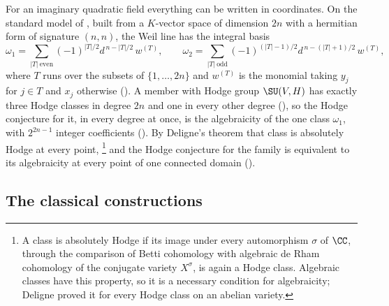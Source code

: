 For an imaginary quadratic field everything can be written in coordinates.
On the standard model of , built from a $K$-vector space of
dimension $2n$ with a hermitian form of signature $(n,n)$, the Weil line has
the integral basis
\[
  \omega_{1}=\sum_{|T|\ \mathrm{even}}(-1)^{|T|/2}d^{\,n-|T|/2}\,w^{(T)},
  \qquad
  \omega_{2}=\sum_{|T|\ \mathrm{odd}}(-1)^{(|T|-1)/2}d^{\,n-(|T|+1)/2}\,w^{(T)},
\]
where $T$ runs over the subsets of $\{1,\dots,2n\}$ and $w^{(T)}$ is the
monomial taking $y_{j}$ for $j\in T$ and $x_{j}$ otherwise
(). A member with Hodge group $\SU(V,H)$ has exactly
three Hodge classes in degree $2n$ and one in every other degree
(), so the Hodge conjecture for it, in every degree at
once, is the algebraicity of the one class $\omega_{1}$, with $2^{2n-1}$
integer coefficients (). By Deligne's theorem
\cite{Del82} that class is absolutely Hodge at every point,%
\footnote{A class is absolutely Hodge if its image under every automorphism
$\sigma$ of $\CC$, through the comparison of Betti cohomology with
algebraic de Rham cohomology of the conjugate variety $X^{\sigma}$, is again
a Hodge class. Algebraic classes have this property, so it is a necessary
condition for algebraicity; Deligne proved it for every Hodge class on an
abelian variety.}
and the Hodge
conjecture for the family is equivalent to its algebraicity at every point of
one connected domain ().


\subsection{The classical constructions}

